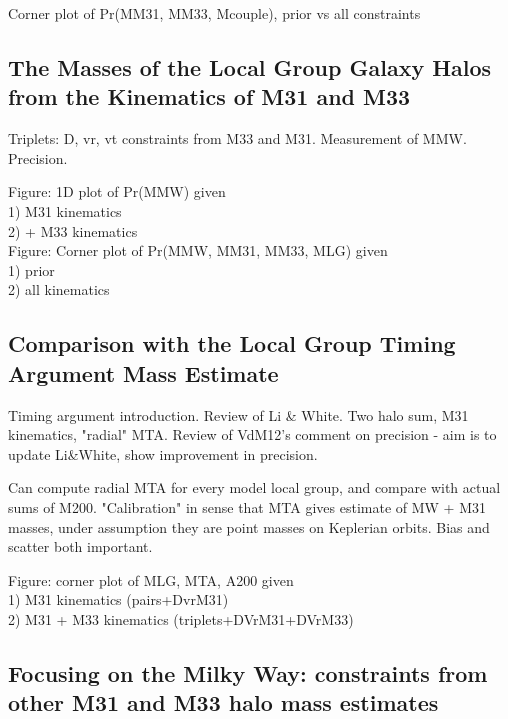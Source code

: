 \documentclass{emulateapj}
\begin{document}
Corner plot of Pr(MM31, MM33, Mcouple), prior vs all constraints


\subsection{The Masses of the Local Group Galaxy Halos from the Kinematics of M31 and M33}
\label{sec:results:jointanalysis}

Triplets: D, vr, vt constraints from M33 and M31. 
Measurement of MMW. Precision. 

Figure: 1D plot of Pr(MMW) given \\
  1) M31 kinematics\\
  2) + M33 kinematics\\

Figure: Corner plot of Pr(MMW, MM31, MM33, MLG) given\\
   1) prior \\
   2) all kinematics \\


\subsection{Comparison with the Local Group Timing Argument Mass Estimate}
\label{sec:results:TA}

Timing argument introduction. Review of Li \& White. Two halo sum, M31
kinematics, "radial" MTA. Review of VdM12's comment on precision - aim is to
update Li\&White, show improvement in precision.  

Can compute radial MTA for every model local group,  and compare with actual
sums of M200. "Calibration" in sense that MTA gives estimate of MW + M31
masses, under assumption they are point masses on Keplerian orbits. Bias and
scatter both important.

Figure: corner plot of MLG, MTA, A200 given \\
  1) M31 kinematics (pairs+DvrM31)\\
  2) M31 + M33 kinematics (triplets+DVrM31+DVrM33)\\


\subsection{Focusing on the Milky Way: constraints from other M31 and M33 halo mass estimates}
\label{sec:results:MW}
\end{document}
